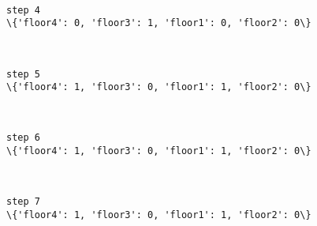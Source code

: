 \documentclass[11pt]{article}
\begin{document}
    \begin{center}
    \end{center}
    { \hspace*{\fill} \\}
    
    \begin{Verbatim}[commandchars=\\\{\}]
step 4
\{'floor4': 0, 'floor3': 1, 'floor1': 0, 'floor2': 0\}

    \end{Verbatim}

    \begin{center}
    \end{center}
    { \hspace*{\fill} \\}
    
    \begin{Verbatim}[commandchars=\\\{\}]
step 5
\{'floor4': 1, 'floor3': 0, 'floor1': 1, 'floor2': 0\}

    \end{Verbatim}

    \begin{center}
    \end{center}
    { \hspace*{\fill} \\}
    
    \begin{Verbatim}[commandchars=\\\{\}]
step 6
\{'floor4': 1, 'floor3': 0, 'floor1': 1, 'floor2': 0\}

    \end{Verbatim}

    \begin{center}
    \end{center}
    { \hspace*{\fill} \\}
    
    \begin{Verbatim}[commandchars=\\\{\}]
step 7
\{'floor4': 1, 'floor3': 0, 'floor1': 1, 'floor2': 0\}

    \end{Verbatim}
\end{document}
